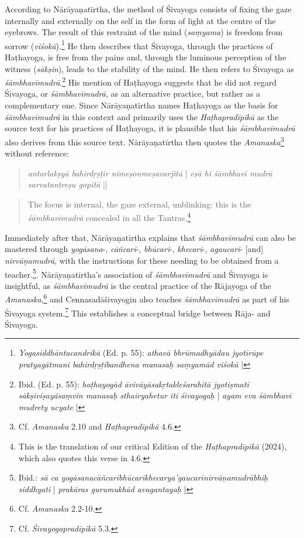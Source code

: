 According to Nārāyaṇatīrtha, the method of Śivayoga consists of fixing the gaze internally and externally on the self in the form of light at the centre of the eyebrows. The result of this restraint of the mind (\textit{saṃyama}) is freedom from sorrow (\textit{viśokā}).\footnote{\textit{Yogasiddhāntacandrikā} (Ed. p. 55): \textit{athavā bhrūmadhyādau jyotīrūpe pratyagātmani bahirdṛṣṭibandhena manasaḥ saṃyamād viśokā} |} He then describes that Śivayoga, through the practices of Haṭhayoga, is free from the pains and, through the luminous perception of the witness (\textit{sākṣin}), leads to the stability of the mind. He then refers to Śivayoga as \textit{śāmbhavīmudrā}.\footnote{Ibid. (Ed. p. 55): \textit{haṭhayogād āvivāyāsakṛtakleśarahitā jyotiṣmatī sākṣiviṣayāsaṃvin manasaḥ sthairyahetur iti śivayogaḥ} | \textit{ayam eva śāmbhavī mudrety ucyate} |} His mention of Haṭhayoga suggests that he did not regard Śivayoga, or \textit{śāmbhavīmudrā}, as an alternative practice, but rather as a complementary one. Since Nārāyaṇatīrtha names Haṭhayoga as the basis for \textit{śāmbhavīmudrā} in this context and primarily uses the \emph{Haṭhapradīpikā} as the source text for his practices of Haṭhayoga, it is plausible that his \textit{śāmbhavīmudrā} also derives from this source text.
Nārāyaṇatīrtha then quotes the \textit{Amanaska}\footnote{Cf. \textit{Amanaska} 2.10 and \emph{Haṭhapradīpikā} 4.6.} without reference: \begin{quote} \textit{antarlakṣyā bahirdṛṣṭir nimeṣonmeṣavarjitā} | \textit{eṣā hi śāmbhavī mudrā sarvatantreṣu gopitā} || \end{quote} \begin{quote} The focus is internal, the gaze external, unblinking: this is the \emph{śāmbhavīmudrā} concealed in all the Tantras.\footnote{This is the translation of our critical Edition of the \textit{Haṭhapradīpikā} (2024), which also quotes this verse in 4.6.} \end{quote}
Immediately after that, Nārāyaṇatīrtha explains that \emph{śāmbhavīmudrā} can also be mastered through \emph{yogāsana}-, \emph{cāñcarī}-, \emph{bhūcarī}-, \emph{khecarī}-, \emph{agaucarī}- [and] \emph{nirvāṇamudrā}, with the instructions for these needing to be obtained from a teacher.\footnote{Ibid.: \textit{sā ca yogāsanacāñcarībhūcarīkhecarya'gaucarīnirvāṇamudrābhiḥ siddhyati} | \textit{prakāras gurumukhād avagantayaḥ} |}.
Nārāyaṇatīrtha's association of \emph{śāmbhavīmudrā} and Śivayoga is insightful, as \emph{śāmbhavīmudrā} is the central practice of the Rājayoga of the \textit{Amanaska},\footnote{Cf. \textit{Amanaska} 2.2-10.} and Cennasadāśivayogin also teaches \emph{śāmbhavīmudrā} as part of his Śivayoga system.\footnote{Cf. \emph{Śivayogapradīpikā} 5.3.} This establishes a conceptual bridge between Rāja- and Śivayoga.

